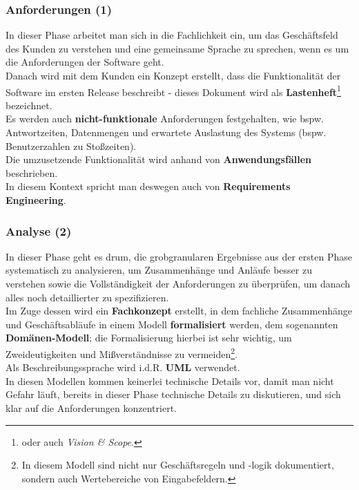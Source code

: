 \subsubsection{Anforderungen (1)}
In dieser Phase arbeitet man sich in die Fachlichkeit ein, um das Geschäftsfeld des Kunden zu verstehen und eine gemeinsame Sprache zu sprechen, wenn es um die Anforderungen der Software geht.\\
Danach wird mit dem Kunden ein Konzept erstellt, dass die Funktionalität der Software im ersten Release beschreibt - dieses Dokument wird als \textbf{Lastenheft}\footnote{
oder auch \textit{Vision \& Scope}.
} bezeichnet.\\
Es werden auch \textbf{nicht-funktionale} Anforderungen festgehalten, wie bspw. Antwortzeiten, Datenmengen und erwartete Auslastung des Systems (bspw. Benutzerzahlen zu Stoßzeiten).\\
Die umzusetzende Funktionalität wird anhand von \textbf{Anwendungsfällen} beschrieben.\\

\noindent
In diesem Kontext spricht man deswegen auch von \textbf{Requirements Engineering}.


\subsubsection{Analyse (2)}
In dieser Phase geht es drum, die grobgranularen Ergebnisse aus der ersten Phase systematisch zu analysieren, um Zusammenhänge und Anläufe besser zu verstehen sowie die Vollständigkeit der Anforderungen zu überprüfen, um danach alles noch detaillierter zu spezifizieren.\\
Im Zuge dessen wird ein \textbf{Fachkonzept} erstellt, in dem fachliche Zusammenhänge und Geschäftsabläufe in einem Modell \textbf{formalisiert} werden, dem sogenannten \textbf{Domänen-Modell}; die Formalisierung hierbei ist sehr wichtig, um Zweideutigkeiten und Mißverständnisse zu vermeiden\footnote{
    In diesem Modell sind nicht nur Geschäftsregeln und -logik dokumentiert, sondern auch Wertebereiche von Eingabefeldern.
}.\\
Als Beschreibungssprache wird i.d.R. \textbf{UML} verwendet.\\

\noindent
In diesen  Modellen kommen keinerlei technische Details vor, damit man nicht Gefahr läuft, bereits in dieser Phase technische Details zu diskutieren, und sich klar auf die Anforderungen konzentriert.\\

